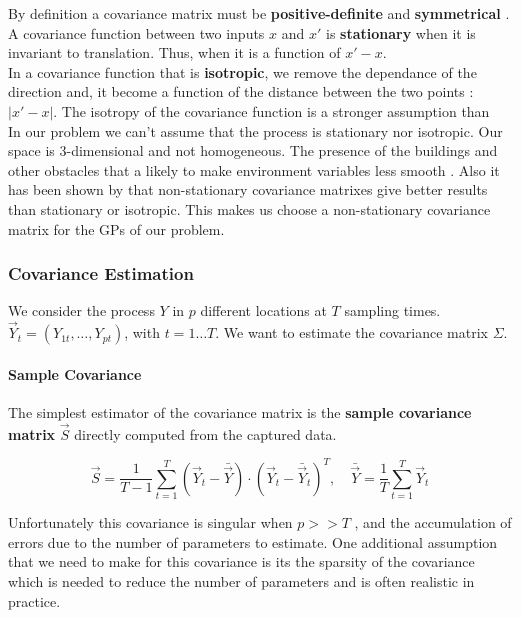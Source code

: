 \documentclass[12pt,twoside]{report}
\begin{document}
By definition a covariance matrix must be \textbf{positive-definite} and \textbf{symmetrical} \citep[p.~80]{rasmussen_gaussian_2006}. \\

A covariance function between two inputs $x$ and $x'$ is \textbf{stationary}   when it is invariant to translation. Thus, when it is a function of $x' - x$. \\
In a covariance function that is \textbf{isotropic}, we remove the dependance of the direction and, it become a function of the distance between the two points :  $|x' - x|$. The isotropy of the covariance function is a stronger assumption than  \\ 

In our problem we can't assume that the process is stationary nor isotropic. Our space is 3-dimensional and not homogeneous. The presence of the buildings and other obstacles that a likely to make environment variables less smooth \citep{paciorek_nonstationary_2004}. Also it has been shown by \citet{krause_near-optimal_2008} that non-stationary covariance matrixes give better results than stationary or isotropic. This makes us choose a non-stationary covariance matrix for the  GPs of our problem.


\subsubsection{Covariance Estimation}

We consider the process $Y$ in $p$ different locations at $T$ sampling times. $\vec{Y}_t = (Y_{1t}, \dots, Y_{pt})$, with $t = 1 \dots T$. We want to estimate the covariance matrix $\Sigma$. \\

\paragraph{Sample Covariance}

The simplest estimator of the covariance matrix is the \textbf{sample covariance matrix} $\vec{S}$ directly computed from the captured data. 

\begin{equation}
	\vec{S} = \frac{1}{T -1} \sum_{t=1}^T (\vec{Y}_t - \bar{\vec{Y}})\cdot (\vec{Y}_t - \bar{\vec{Y}}_t)^T, \quad \bar{\vec{Y}} = \frac{1}{T} \sum_{t=1}^T \vec{Y}_t
\end{equation}

Unfortunately this  covariance is singular when $p >> T$ \citep{fan_overview_2015}, and the accumulation of errors due to the number of parameters to estimate. One additional assumption that we need to make for this covariance is its the sparsity of the covariance which is needed to reduce the number of parameters and is often realistic in practice. 
\end{document}
